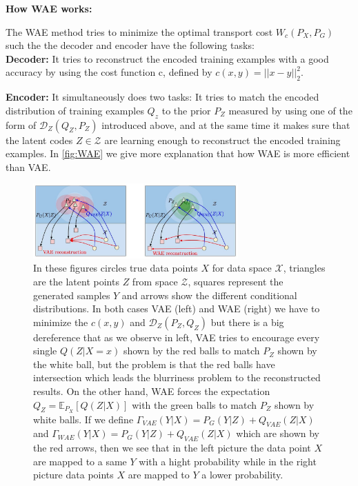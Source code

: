 \documentclass[12pt,english]{amsart}
\begin{document}
\textbf{How WAE works:}

The WAE method tries to minimize the optimal transport cost $W_c(P_X, P_G)$ such
the the decoder and encoder have the following tasks:\\

\textbf{Decoder:} It tries to reconstruct the encoded training examples with a
good accuracy by using the cost function c, defined by $c(x,y)= ||x-y||_2^2$.

\textbf{Encoder:} It simultaneously does two tasks: It tries to match the encoded
distribution of training examples $Q_z$ to the prior $P_Z$ measured by using one
of the form of $\mathcal{D}_Z(Q_Z,P_Z)$ introduced above, and at the same time it
makes sure that the latent codes $Z \in \mathcal{Z}$ are learning enough to
reconstruct the encoded training examples.  In \ref{fig:WAE} we give more explanation
that how WAE is more efficient than VAE.

\begin{figure}[h!]
\centering
\includegraphics[width=0.7\textwidth]{./figures/im1.jpg}

\caption{In these figures circles true data points $X$ for data space
$\mathcal{X}$, triangles are the latent points $Z$ from space $\mathcal{Z}$,
squares represent the generated samples $Y$ and arrows show the different
conditional distributions. In both cases VAE (left) and WAE (right) we have to
minimize the $c(x,y)$ and $\mathcal{D}_Z(P_Z,Q_Z)$  but there is a big
dereference that as we observe in left, VAE tries to encourage every single
$Q(Z|X=x)$ shown by the red balls to match $P_Z$ shown by the white ball, but
the problem is that the red balls have intersection which leads the blurriness
problem to the reconstructed results. On the other hand, WAE forces the
expectation $Q_Z= \mathbb{E}_{P_X}\left[ Q(Z|X)\right]$  with the green balls to
match $P_Z$ shown by white balls. If we define
$\Gamma_{VAE}(Y|X)= P_G(Y|Z)+ Q_{VAE}(Z|X)$ and
$\Gamma _{WAE}(Y|X)= P_G(Y|Z)+ Q_{VAE}(Z|X)$ which are shown by the red arrows,
then we see that in the left picture the data point $X$ are mapped to a same $Y$
with a hight probability while in the right picture data points $X$ are mapped to
$Y$ a lower probability. }

\label{Figure 1}
\end{figure}
\end{document}
